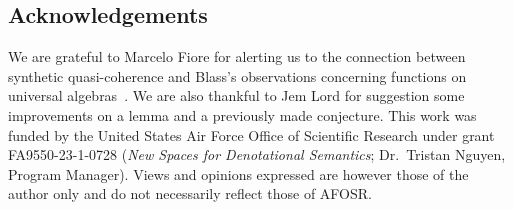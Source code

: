 \subsection*{Acknowledgements}

We are grateful to Marcelo Fiore for alerting us to the connection between synthetic quasi-coherence and Blass's observations concerning functions on universal algebras~\citep{RN879}. We are also thankful to Jem Lord for suggestion some improvements on a lemma and a previously made conjecture.
 This work was funded by the United States Air Force Office of Scientific Research under grant FA9550-23-1-0728 (\emph{New Spaces for Denotational Semantics}; Dr.\ Tristan Nguyen, Program Manager). Views and opinions expressed are however those of the author only and do not necessarily reflect those of AFOSR.
